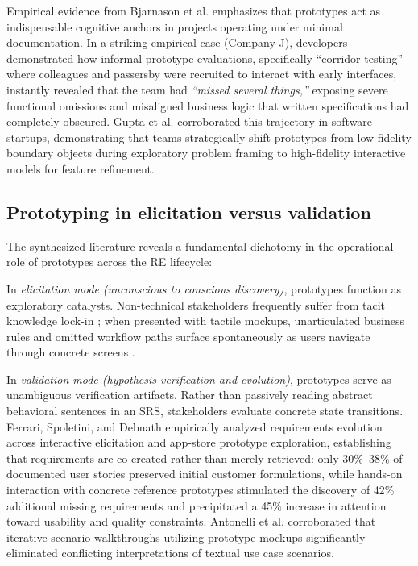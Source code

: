 \documentclass[conference]{IEEEtran}
\begin{document}
Empirical evidence from Bjarnason et al. \cite{bjarnason2023empirically} emphasizes that prototypes act as indispensable cognitive anchors in projects operating under minimal documentation. In a striking empirical case (Company J), developers demonstrated how informal prototype evaluations, specifically ``corridor testing'' where colleagues and passersby were recruited to interact with early interfaces, instantly revealed that the team had \textit{``missed several things,''} exposing severe functional omissions and misaligned business logic that written specifications had completely obscured. Gupta et al. \cite{gupta2022strategic} corroborated this trajectory in software startups, demonstrating that teams strategically shift prototypes from low-fidelity boundary objects during exploratory problem framing to high-fidelity interactive models for feature refinement.

\subsection{Prototyping in elicitation versus validation}
The synthesized literature reveals a fundamental dichotomy in the operational role of prototypes across the RE lifecycle:

In \textit{elicitation mode (unconscious to conscious discovery)}, prototypes function as exploratory catalysts. Non-technical stakeholders frequently suffer from tacit knowledge lock-in \cite{ferrari2016ambiguity}; when presented with tactile mockups, unarticulated business rules and omitted workflow paths surface spontaneously as users navigate through concrete screens \cite{hickey1998prototyping}.

In \textit{validation mode (hypothesis verification and evolution)}, prototypes serve as unambiguous verification artifacts. Rather than passively reading abstract behavioral sentences in an SRS, stakeholders evaluate concrete state transitions. Ferrari, Spoletini, and Debnath \cite{rej2022evolve} empirically analyzed requirements evolution across interactive elicitation and app-store prototype exploration, establishing that requirements are co-created rather than merely retrieved: only 30\%--38\% of documented user stories preserved initial customer formulations, while hands-on interaction with concrete reference prototypes stimulated the discovery of 42\% additional missing requirements and precipitated a 45\% increase in attention toward usability and quality constraints. Antonelli et al. \cite{antonelli2022iterative} corroborated that iterative scenario walkthroughs utilizing prototype mockups significantly eliminated conflicting interpretations of textual use case scenarios.
\end{document}

